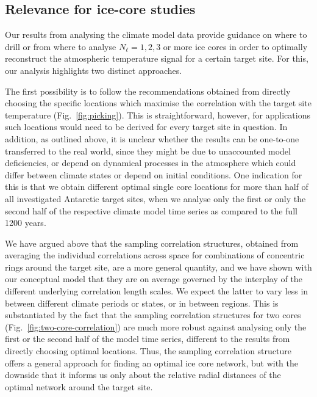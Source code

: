 \documentclass[cp, manuscript]{copernicus}
\begin{document}
\subsection{Relevance for ice-core studies}
\label{discussion:relevance}

Our results from analysing the climate model data provide guidance on where to
drill or from where to analyse $N_{\ell}=1, 2, 3$ or more ice cores in order to
optimally reconstruct the atmospheric temperature signal for a certain target
site. For this, our analysis highlights two distinct approaches.

The first possibility is to follow the recommendations obtained from directly
choosing the specific locations which maximise the correlation with the target
site temperature (Fig.~\ref{fig:picking}). This is straightforward, however, for
applications such locations would need to be derived for every target site in
question. In addition, as outlined above, it is unclear whether the results can
be one-to-one transferred to the real world, since they might be due to
unaccounted model deficiencies, or depend on dynamical processes in the
atmosphere which could differ between climate states or depend on initial
conditions. One indication for this is that we obtain different optimal single
core locations for more than half of all investigated Antarctic target sites,
when we analyse only the first or only the second half of the respective climate
model time series as compared to the full 1200 years.

We have argued above that the sampling correlation structures, obtained from
averaging the individual correlations across space for combinations of
concentric rings around the target site, are a more general quantity, and we
have shown with our conceptual model that they are on average governed by the
interplay of the different underlying correlation length scales. We expect the
latter to vary less in between different climate periods or states, or in
between regions. This is substantiated by the fact that the sampling correlation
structures for two cores (Fig.~\ref{fig:two-core-correlation}) are much more
robust against analysing only the first or the second half of the model time
series, different to the results from directly choosing optimal locations. Thus,
the sampling correlation structure offers a general approach for finding an
optimal ice core network, but with the downside that it informs us only about
the relative radial distances of the optimal network around the target site.
\end{document}
